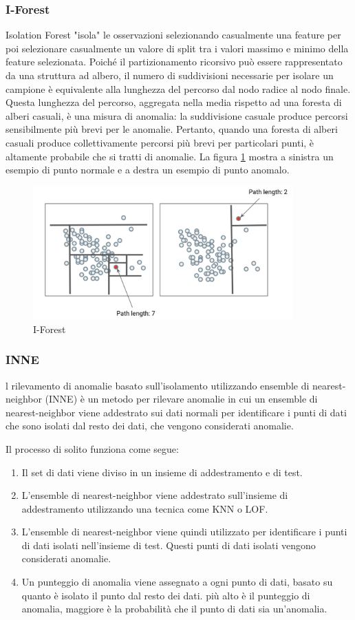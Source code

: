 \subsubsection{I-Forest}
Isolation Forest "isola" le osservazioni selezionando casualmente una feature per poi selezionare casualmente un valore di split tra i valori massimo e minimo della feature selezionata. 
Poiché il partizionamento ricorsivo può essere rappresentato da una struttura ad albero, il numero di suddivisioni necessarie per isolare un campione è equivalente alla lunghezza del percorso dal nodo radice al nodo finale.
Questa lunghezza del percorso, aggregata nella media rispetto ad una foresta di alberi casuali, è una misura di anomalia: la suddivisione casuale produce percorsi sensibilmente più brevi per le anomalie. Pertanto, quando una foresta di alberi casuali produce collettivamente percorsi più brevi per particolari punti, è altamente probabile che si tratti di anomalie.
La figura \ref{iforest} mostra a sinistra un esempio di punto normale e a destra un esempio di punto anomalo.
\begin{figure}[t]
	\centering
	\includegraphics[width=10cm, scale=1]{images/iforest}
	\caption{I-Forest}
	\label{iforest}
\end{figure}
\subsubsection{INNE}
l rilevamento di anomalie basato sull'isolamento utilizzando ensemble di nearest-neighbor (INNE) è un metodo per rilevare anomalie in cui un ensemble di nearest-neighbor viene addestrato sui dati normali per identificare i punti di dati che sono isolati dal resto dei dati, che vengono considerati anomalie.

Il processo di solito funziona come segue:
\begin{enumerate}
\item Il set di dati viene diviso in un insieme di addestramento e di test.
\item L'ensemble di nearest-neighbor viene addestrato sull'insieme di addestramento utilizzando una tecnica come KNN o LOF.
\item L'ensemble di nearest-neighbor viene quindi utilizzato per identificare i punti di dati isolati nell'insieme di test. Questi punti di dati isolati vengono considerati anomalie.
\item Un punteggio di anomalia viene assegnato a ogni punto di dati, basato su quanto è isolato il punto dal resto dei dati. più alto è il punteggio di anomalia, maggiore è la probabilità che il punto di dati sia un'anomalia.
\end{enumerate}

